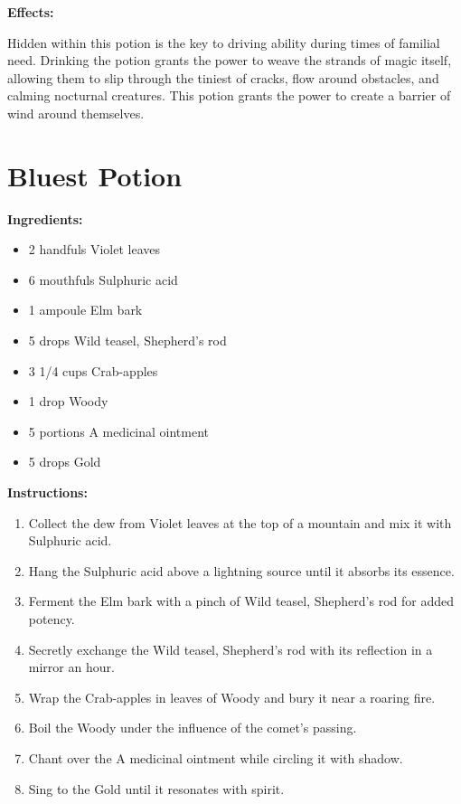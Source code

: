 \documentclass{article}
\begin{document}
\textbf{Effects:}

Hidden within this potion is the key to driving ability during times of familial need. Drinking the potion grants the power to weave the strands of magic itself, allowing them to slip through the tiniest of cracks, flow around obstacles, and calming nocturnal creatures. This potion grants the power to create a barrier of wind around themselves.

\newpage
\section*{Bluest Potion}

\textbf{Ingredients:}

\begin{itemize}
  \item 2 handfuls Violet leaves
  \item 6 mouthfuls Sulphuric acid
  \item 1 ampoule Elm bark
  \item 5 drops Wild teasel, Shepherd's rod
  \item 3 1/4 cups Crab-apples
  \item 1 drop Woody
  \item 5 portions A medicinal ointment
  \item 5 drops Gold
\end{itemize}

\textbf{Instructions:}

\begin{enumerate}
  \item Collect the dew from Violet leaves at the top of a mountain and mix it with Sulphuric acid.
  \item Hang the Sulphuric acid above a lightning source until it absorbs its essence.
  \item Ferment the Elm bark with a pinch of Wild teasel, Shepherd's rod for added potency.
  \item Secretly exchange the Wild teasel, Shepherd's rod with its reflection in a mirror an hour.
  \item Wrap the Crab-apples in leaves of Woody and bury it near a roaring fire.
  \item Boil the Woody under the influence of the comet’s passing.
  \item Chant over the A medicinal ointment while circling it with shadow.
  \item Sing to the Gold until it resonates with spirit.
\end{enumerate}
\end{document}
